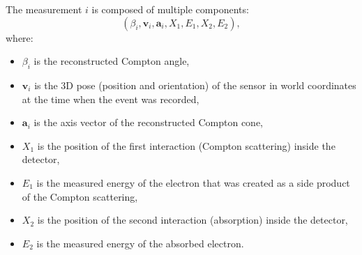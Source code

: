The measurement $i$ is composed of multiple components:
\begin{equation}
  (\beta_{i}, \mathbf{v}_{i}, \mathbf{a}_{i}, X_{1}, E_{1}, X_{2}, E_{2}),
\end{equation}
where:
\begin{itemize}
  \item $\beta_{i}$ is the reconstructed Compton angle,
  \item $\mathbf{v}_{i}$ is the 3D pose (position and orientation) of the sensor in world coordinates at the time when the event was recorded,
  \item $\mathbf{a}_{i}$ is the axis vector of the reconstructed Compton cone,
  \item $X_{1}$ is the position of the first interaction (Compton scattering) inside the detector,
  \item $E_{1}$ is the measured energy of the electron that was created as a side product of the Compton scattering,
  \item $X_{2}$ is the position of the second interaction (absorption) inside the detector,
  \item $E_{2}$ is the measured energy of the absorbed electron.
\end{itemize}

